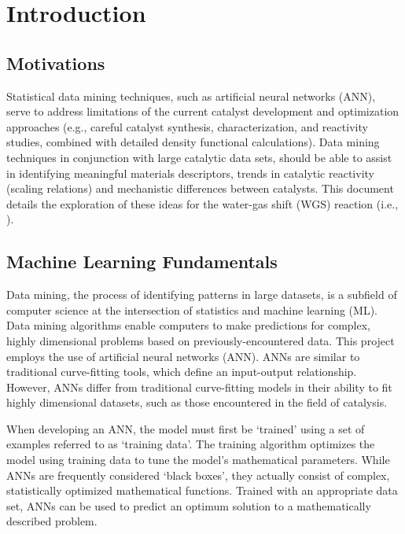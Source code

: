 
\chapter{Introduction}
\label{ch:intro}
\section{Motivations}
Statistical data mining techniques, such as artificial neural networks (ANN), serve to address limitations of the current catalyst development and optimization approaches (e.g., careful catalyst synthesis, characterization, and reactivity studies, combined with detailed density functional calculations). Data mining techniques in conjunction with large catalytic data sets, should be able to assist in identifying meaningful materials descriptors, trends in catalytic reactivity (scaling relations) and mechanistic differences between catalysts. This document details the exploration of these ideas for the water-gas shift (WGS) reaction (i.e., ).
\section{Machine Learning Fundamentals}
Data mining, the process of identifying patterns in large datasets, is a subfield of computer science at the intersection of statistics and machine learning (ML). Data mining algorithms enable computers to make predictions for complex, highly dimensional problems based on previously-encountered data. This project employs the use of artificial neural networks (ANN). ANNs are similar to traditional curve-fitting tools, which define an input-output relationship. However, ANNs differ from traditional curve-fitting models in their ability to fit highly dimensional datasets, such as those encountered in the field of catalysis. 

When developing an ANN, the model must first be `trained' using a set of examples referred to as `training data'. The training algorithm optimizes the model using training data to tune the model's mathematical parameters. While ANNs are frequently considered `black boxes', they actually consist of complex, statistically optimized mathematical functions. Trained with an appropriate data set, ANNs can be used to predict an optimum solution to a mathematically described problem. 

